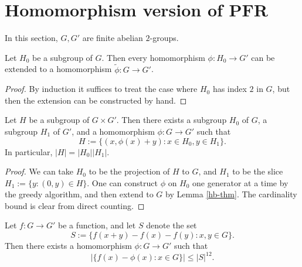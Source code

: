 \chapter{Homomorphism version of PFR}

In this section, $G, G'$ are finite abelian $2$-groups.

\begin{lemma}\label{hb-thm}\leanok  Let $H_0$ be a subgroup of $G$.  Then every homomorphism $\phi: H_0 \to G'$ can be extended to a homomorphism $\tilde \phi: G \to G'$.
\end{lemma}

\begin{proof}\leanok  By induction it suffices to treat the case where $H_0$ has index $2$ in $G$, but then the extension can be constructed by hand.
\end{proof}

\begin{lemma}\label{goursat}\leanok  Let $H$ be a subgroup of $G \times G'$.  Then there exists a subgroup $H_0$ of $G$, a subgroup $H_1$ of $G'$, and a homomorphism $\phi: G \to G'$ such that
$$ H := \{ (x, \phi(x) + y): x \in H_0, y \in H_1 \}.$$
In particular, $|H| = |H_0| |H_1|$.
\end{lemma}

\begin{proof}\leanok We can take $H_0$ to be the projection of $H$ to $G$, and $H_1$ to be the slice $H_1 := \{ y: (0,y) \in H \}$.  One can construct $\phi$ on $H_0$ one generator at a time by the greedy algorithm, and then extend to $G$ by Lemma \ref{hb-thm}.  The cardinality bound is clear from direct counting.
\end{proof}

\begin{theorem}\label{hom-pfr}\leanok  Let $f: G \to G'$ be a function, and let $S$ denote the set
$$ S := \{ f(x+y)-f(x)-f(y): x,y \in G \}.$$
Then there exists a homomorphism $\phi: G \to G'$ such that
$$ |\{ f(x) - \phi(x): x \in G \}| \leq |S|^{12}.$$
\end{theorem}

